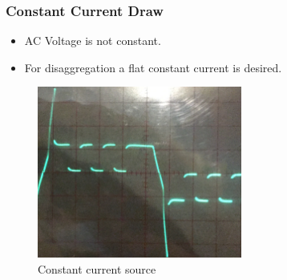 \documentclass{beamer}
\begin{document}
	\begin{frame}\frametitle{Constant Current Draw}


		\begin{itemize}

			\item AC Voltage is not constant.

			\item For disaggregation a flat constant current is desired.

		\end{itemize}

		\begin{figure}
			\centering
			\includegraphics[width=0.6\textwidth]{../chapters/hardware-chapters/current-source-measurement-cropped.png}
			\caption{Constant current source}
		\end{figure}


	\end{frame}
\end{document}
